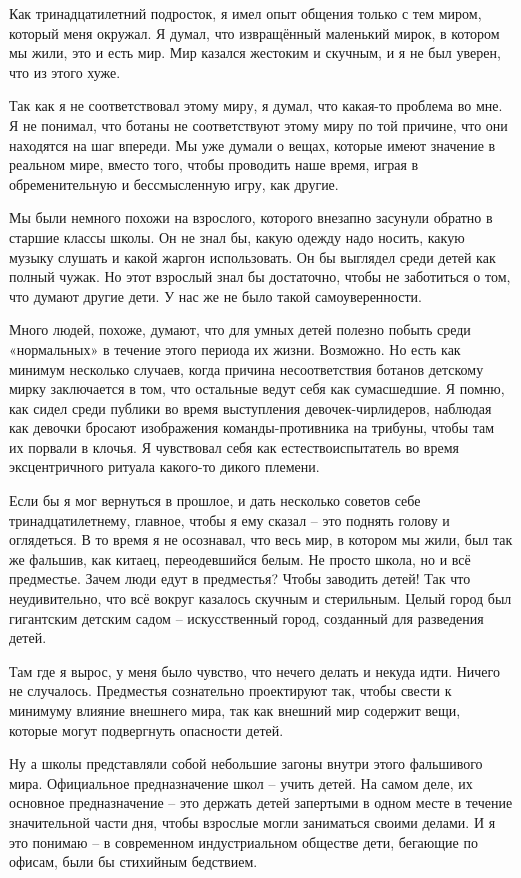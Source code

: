 \documentclass[ebook,12pt,oneside,openany]{memoir}
\begin{document}
Как тринадцатилетний подросток, я имел опыт общения только с тем
миром, который меня окружал. Я думал, что извращённый маленький мирок,
в котором мы жили, это и есть мир. Мир казался жестоким и скучным, и я
не был уверен, что из этого хуже.

Так как я не соответствовал этому миру, я думал, что какая-то проблема
во мне. Я не понимал, что ботаны не соответствуют этому миру по той
причине, что они находятся на шаг впереди. Мы уже думали о вещах,
которые имеют значение в реальном мире, вместо того, чтобы проводить
наше время, играя в обременительную и бессмысленную игру, как другие.

Мы были немного похожи на взрослого, которого внезапно засунули
обратно в старшие классы школы. Он не знал бы, какую одежду надо
носить, какую музыку слушать и какой жаргон использовать. Он бы
выглядел среди детей как полный чужак. Но этот взрослый знал бы
достаточно, чтобы не заботиться о том, что думают другие дети. У нас
же не было такой самоуверенности.

Много людей, похоже, думают, что для умных детей полезно побыть среди
«нормальных» в течение этого периода их жизни. Возможно. Но есть как
минимум несколько случаев, когда причина несоответствия ботанов
детскому мирку заключается в том, что остальные ведут себя как
сумасшедшие. Я помню, как сидел среди публики во время выступления
девочек-чирлидеров, наблюдая как девочки бросают изображения
команды-противника на трибуны, чтобы там их порвали в клочья. Я
чувствовал себя как естествоиспытатель во время эксцентричного ритуала
какого-то дикого племени.


Если бы я мог вернуться в прошлое, и дать несколько советов себе
тринадцатилетнему, главное, чтобы я ему сказал – это поднять голову и
оглядеться. В то время я не осознавал, что весь мир, в котором мы
жили, был так же фальшив, как китаец, переодевшийся белым. Не просто
школа, но и всё предместье. Зачем люди едут в предместья? Чтобы
заводить детей! Так что неудивительно, что всё вокруг казалось скучным
и стерильным. Целый город был гигантским детским садом – искусственный
город, созданный для разведения детей.

Там где я вырос, у меня было чувство, что нечего делать и некуда идти.
Ничего не случалось. Предместья сознательно проектируют так, чтобы
свести к минимуму влияние внешнего мира, так как внешний мир содержит
вещи, которые могут подвергнуть опасности детей.

Ну а школы представляли собой небольшие загоны внутри этого фальшивого
мира. Официальное предназначение школ – учить детей. На самом деле, их
основное предназначение – это держать детей запертыми в одном месте в
течение значительной части дня, чтобы взрослые могли заниматься своими
делами. И я это понимаю – в современном индустриальном обществе дети,
бегающие по офисам, были бы стихийным бедствием.
\end{document}
